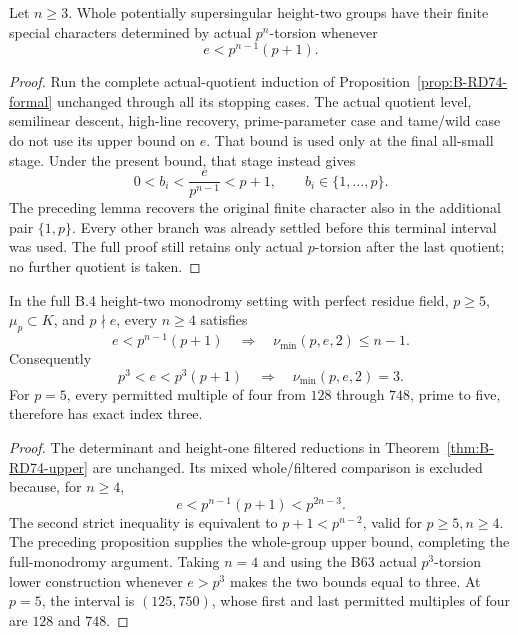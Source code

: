 \begin{proposition}
\label{prop:B-RD75-formal}
Let \(n\ge3\). Whole potentially supersingular height-two
groups have their finite special characters determined by
actual \(p^n\)-torsion whenever
\[
 e<p^{n-1}(p+1).
 \tag{B-RD75.3}
\]
\end{proposition}
\begin{proof}
Run the complete actual-quotient induction of
Proposition~\ref{prop:B-RD74-formal} unchanged through all
its stopping cases. The actual quotient level, semilinear
descent, high-line recovery, prime-parameter case and tame/wild
case do not use its upper bound on \(e\). That bound is used
only at the final all-small stage. Under the present bound,
that stage instead gives
\[
 0<b_i<\frac{e}{p^{n-1}}<p+1,
 \qquad b_i\in\{1,\ldots,p\}.
 \tag{B-RD75.4}
\]
The preceding lemma recovers the original finite character
also in the additional pair \(\{1,p\}\). Every other branch
was already settled before this terminal interval was used.
The full proof still retains only actual \(p\)-torsion after
the last quotient; no further quotient is taken.
\end{proof}

\begin{theorem}
\label{thm:B-RD75}
In the full B.4 height-two monodromy setting with perfect
residue field, \(p\ge5\), \(\mu_p\subset K\), and \(p\nmid e\),
every \(n\ge4\) satisfies
\[
 e<p^{n-1}(p+1)\quad\Longrightarrow\quad
 \nu_{\min}(p,e,2)\le n-1.
 \tag{B-RD75.5}
\]
Consequently
\[
 p^3<e<p^3(p+1)\quad\Longrightarrow\quad
 \boxed{\nu_{\min}(p,e,2)=3}.
 \tag{B-RD75.6}
\]
For \(p=5\), every permitted multiple of four from \(128\)
through \(748\), prime to five, therefore has exact index three.
\end{theorem}
\begin{proof}
The determinant and height-one filtered reductions in
Theorem~\ref{thm:B-RD74-upper} are unchanged. Its mixed
whole/filtered comparison is excluded because, for \(n\ge4\),
\[
 e<p^{n-1}(p+1)<p^{2n-3}.
 \tag{B-RD75.7}
\]
The second strict inequality is equivalent to
\(p+1<p^{n-2}\), valid for \(p\ge5,n\ge4\).
The preceding proposition supplies the whole-group upper
bound, completing the full-monodromy argument.
Taking \(n=4\) and using the B63 actual \(p^3\)-torsion
lower construction whenever \(e>p^3\) makes the two bounds
equal to three. At \(p=5\), the interval is \((125,750)\),
whose first and last permitted multiples of four are \(128\)
and \(748\).
\end{proof}

